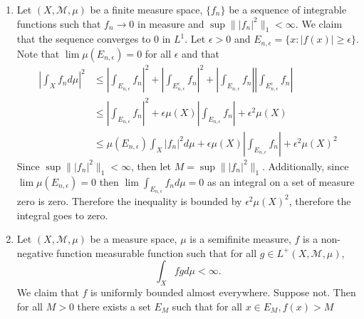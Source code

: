 \documentclass[12pt, letterpaper]{article}
\begin{document}
\begin{enumerate}
	\item[12] Let $(X,\mathcal M, \mu)$ be a finite measure space, $\{f_n\}$ be a sequence of integrable functions such that 
	$f_n \to 0$ in measure and $\sup \| |f_n|^2 \|_1 < \infty$.  We claim that the sequence converges to 0 in $L^1$.
	Let $\epsilon > 0$ and $E_{n,\epsilon} = \{x: |f(x)| \geq \epsilon\}$.  Note that $\lim \mu(E_{n,\epsilon}) = 0$ 
	for all $\epsilon$ and that  
	\begin{align*}
	|\int_X f_n d \mu|^2 &\leq |\int_{E_{n,\epsilon}} f_n|^2 + |\int_{E_{n,\epsilon}^c} f_n|^2 +|\int_{E_{n,\epsilon}} f_n||\int_{E_{n,\epsilon}^c} f_n|\\
	&\leq |\int_{E_{n,\epsilon}} f_n|^2 + \epsilon \mu(X)|\int_{E_{n,\epsilon}} f_n| + \epsilon^2\mu(X) \\
	&\leq \mu(E_{n,\epsilon})\int_X |f_n|^2 d \mu + \epsilon \mu(X)|\int_{E_{n,\epsilon}} f_n|+ \epsilon^2\mu(X)^2
	\end{align*}
	Since $\sup \||f_n|^2\|_1 < \infty$, then let $M = \sup \||f_n|^2\|_1$.  Additionally, since $\lim 
	\mu(E_{n,\epsilon}) = 0$ then $\lim \int_{E_{n,\epsilon}} f_n d\mu = 0$ as an integral on a set of measure zero is 
	zero.  Therefore the inequality is bounded by $\epsilon^2 \mu(X)^2$, therefore the integral goes to zero.
	
	\item[13] Let $(X, \mathcal{M}, \mu)$ be a measure space, $\mu$ is a semifinite measure, $f$ is a non-negative 
	function measurable function such that for all $g \in L^+(X,\mathcal{M}, \mu)$, 
	$$
	\int_X fg d\mu < \infty.
	$$
	We claim that $f$ is uniformly bounded almost everywhere.  Suppose not.  Then for all $M > 0$ there exists 
	a set $E_M$ such that for all $x \in E_M, f(x) > M$
\end{enumerate}
\end{document}
